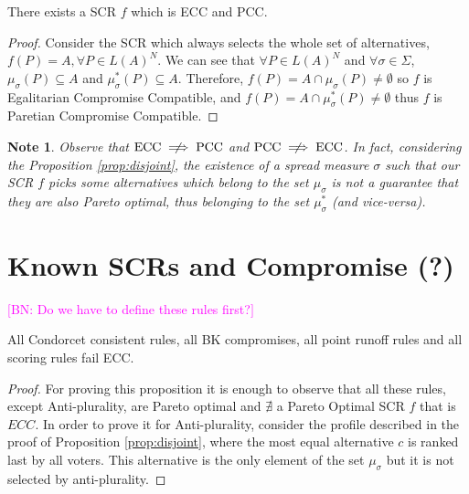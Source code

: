 \documentclass[version=3.21, pagesize, notitlepage, twoside=off, bibliography=totoc, DIV=calc, fontsize=12pt, a4paper]{scrartcl}
\newtheorem*{note}{Note}
\newcommand{\commentBN}[1]{\textcolor{magenta}{\small$\big[$BN: #1$\big]$}}
\newcommand{\musigma}{\mu_{\sigma}}
\newcommand{\mustar}{\mu_{\sigma}^*}
\begin{document}
\vspace{+1ex}
\begin{proposition}
	There exists a SCR $f$ which is ECC and PCC.
\end{proposition}
\begin{proof}
	Consider the SCR which always selects the whole set of alternatives, $f(P)=A, \forall P \in L(A)^N$. We can see that $\forall P \in L(A)^N$ and $\forall \sigma \in \Sigma$, $\musigma(P) \subseteq A$ and $\mustar(P) \subseteq A$. Therefore, $f(P)=A \cap \musigma(P) \neq \emptyset$ so $f$ is Egalitarian Compromise Compatible, and $f(P)=A \cap \mustar(P) \neq \emptyset$ thus $f$ is Paretian Compromise Compatible.
\end{proof}
\begin{note}
	Observe that $\text{ECC} \centernot \implies \text{PCC}$ and $\text{PCC} \centernot \implies \text{ECC}$.
	In fact, considering the Proposition \ref{prop:disjoint}, the existence of a spread measure $\sigma$ such that our SCR $f$ picks some alternatives which belong to the set $\musigma$ is not a guarantee that they are also Pareto optimal, thus belonging to the set $\mustar$ (and vice-versa).
\end{note}


\section{Known SCRs and Compromise (?)}
\commentBN{Do we have to define these rules first?}
\begin{proposition}
	All Condorcet consistent rules, all BK compromises, all point runoff rules and all scoring rules fail ECC.
\end{proposition}
\begin{proof}
	For proving this proposition it is enough to observe that all these rules, except Anti-plurality, are Pareto optimal and $\nexists$ a Pareto Optimal SCR $f$ that is $ECC$. 
	In order to prove it for Anti-plurality, consider the profile described in the proof of Proposition \ref{prop:disjoint}, where the most equal alternative $c$ is ranked last by all voters. This alternative is the only element of the set $\musigma$ but it is not selected by anti-plurality. 
\end{proof}
\end{document}
